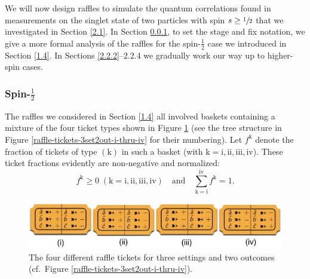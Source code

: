 

We will now design raffles to simulate the quantum correlations found in measurements on the singlet state of two particles with spin $s \ge \sfrac12$ that we investigated in Section \ref{2.1}. In Section \ref{2.2.1}, to set the stage and fix notation, we give a more formal analysis of the raffles for the spin-$\frac12$ case we introduced in Section \ref{1.4}. In Sections \ref{2.2.2}--{2.2.4} we gradually work our way up to higher-spin cases. 

\subsubsection{Spin-$\frac12$}  \label{2.2.1}

The raffles we considered in Section \ref{1.4} all involved baskets containing a mixture of the four ticket types shown in Figure \ref{raffle-tickets-3set2out-i-thru-iv-row} (see the tree structure in Figure \ref{raffle-tickets-3set2out-i-thru-iv} for their numbering). Let $f^{\mathrm{k}}$ denote the fraction of tickets of type $(\mathrm{k})$ in such a basket (with $\mathrm{k} = \mathrm{i}, \mathrm{ii}, \mathrm{iii}, \mathrm{iv}$). These ticket fractions evidently are non-negative and normalized:
\begin{equation}
f^{\mathrm{k}}\geq 0 \; (\mathrm{k} = \mathrm{i}, \mathrm{ii}, \mathrm{iii}, \mathrm{iv}) \quad\text{and}\quad \sum_{\mathrm{k=i}}^{\mathrm{iv}} f^{\mathrm{k}}=1.
  \label{3-simplex}
\end{equation}

\begin{figure}[h]
 \centering
   \includegraphics[width=6in]{raffle-tickets-3set2out-i-thru-iv-row.jpeg} 
   \caption{The four different raffle tickets for three settings and two outcomes (cf.\ Figure \ref{raffle-tickets-3set2out-i-thru-iv}).}
   \label{raffle-tickets-3set2out-i-thru-iv-row}
   \end{figure}
   
